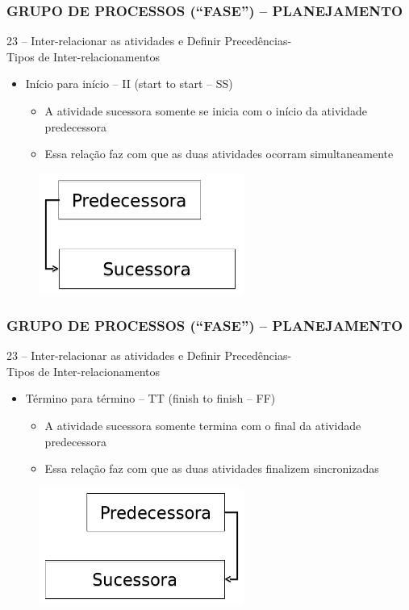 \begin{frame}
 \frametitle{GRUPO DE PROCESSOS (“FASE”) – PLANEJAMENTO}
23 – Inter-relacionar as atividades e Definir Precedências-\\
Tipos de Inter-relacionamentos
  \begin{itemize}
   \item Início para início – II (start to start – SS)
   \begin{itemize}
    \item A atividade sucessora somente se inicia com o início da atividade predecessora
    \item Essa relação faz com que as duas atividades ocorram simultaneamente
   \end{itemize}
  \end{itemize}
  \begin{figure}
   \centering
   \includegraphics[width = 0.6\textwidth]{figs/fig5.png}
  \end{figure}
\end{frame}

\begin{frame}
 \frametitle{GRUPO DE PROCESSOS (“FASE”) – PLANEJAMENTO}
23 – Inter-relacionar as atividades e Definir Precedências- \\
Tipos de Inter-relacionamentos
  \begin{itemize}
   \item Término para término – TT (finish to finish – FF)
   \begin{itemize}
    \item A atividade sucessora somente termina com o final da atividade predecessora
    \item Essa relação faz com que as duas atividades finalizem sincronizadas
   \end{itemize}
  \end{itemize}
  \begin{figure}
   \centering
   \includegraphics[width = 0.6\textwidth]{figs/fig6.png}
  \end{figure}
\end{frame}

